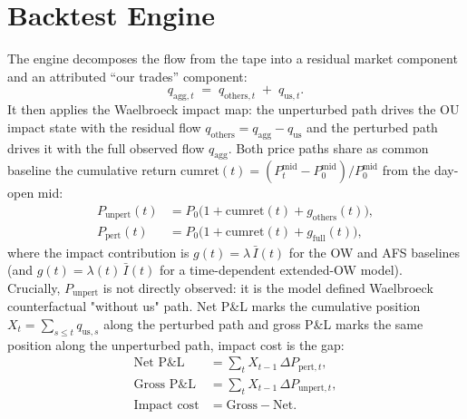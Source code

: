 \documentclass[11pt,a4paper]{article}
\begin{document}
\section{Backtest Engine}\label{sec:bt}

The engine decomposes the flow from the tape into a
residual market component and an attributed ``our trades'' component:
\[
  q_{\text{agg},t} \;=\; q_{\text{others},t} \;+\; q_{\text{us},t}.
\]
It then applies the Waelbroeck impact map: the unperturbed path drives the OU impact state with the residual flow $q_{\text{others}} = q_{\text{agg}} - q_{\text{us}}$ and
the perturbed path drives it with the full observed flow $q_{\text{agg}}$.  Both price paths share as common baseline the cumulative return $\text{cumret}(t) = (P^{\text{mid}}_t - P^{\text{mid}}_0)/P^{\text{mid}}_0$ from the day-open mid:
\begin{align}
  P_{\text{unpert}}(t) &= P_0\bigl(1 + \text{cumret}(t) + g_{\text{others}}(t)\bigr),
  \label{eq:punpert}\\
  P_{\text{pert}}(t) &= P_0\bigl(1 + \text{cumret}(t) + g_{\text{full}}(t)\bigr),
  \label{eq:ppert}
\end{align}
where the impact contribution is $g(t) = \lambda\,\bar I(t)$ for the OW and AFS baselines (and $g(t) = \lambda(t)\,\bar I(t)$ for a time-dependent extended-OW model).
\\
Crucially, $P_{\text{unpert}}$ is not directly observed: it is the model defined Waelbroeck counterfactual "without us" path.  Net P\&L marks the cumulative position $X_t = \sum_{s\le t} q_{\text{us},s}$ along the perturbed path and gross P\&L marks the same position along the unperturbed path, impact cost is the gap:
\begin{align}
  \text{Net P\&L}     &= \textstyle\sum_t X_{t-1}\,\Delta P_{\text{pert},t},
  \label{eq:netpnl}\\
  \text{Gross P\&L}   &= \textstyle\sum_t X_{t-1}\,\Delta P_{\text{unpert},t},
  \label{eq:grosspnl}\\
  \text{Impact cost}  &= \text{Gross} - \text{Net}.
  \label{eq:impact}
\end{align}
\end{document}
